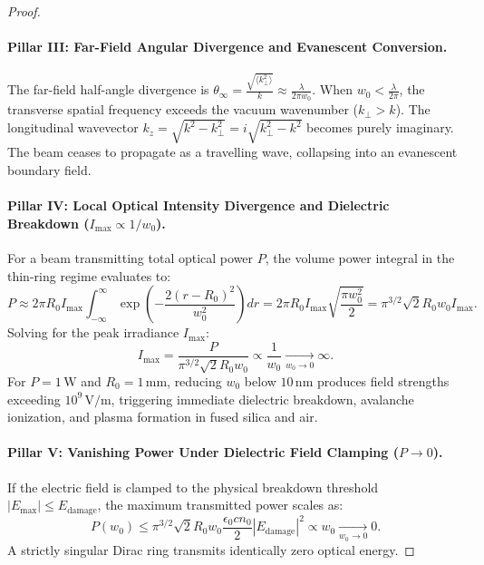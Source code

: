 \documentclass{optica-article}
\begin{document}
\begin{proof}
\paragraph{Pillar III: Far-Field Angular Divergence and Evanescent Conversion.}
The far-field half-angle divergence is $\theta_\infty = \frac{\sqrt{\langle k_\perp^2 \rangle}}{k} \approx \frac{\lambda}{2\pi w_0}$. When $w_0 < \frac{\lambda}{2\pi}$, the transverse spatial frequency exceeds the vacuum wavenumber ($k_\perp > k$). The longitudinal wavevector $k_z = \sqrt{k^2 - k_\perp^2} = i \sqrt{k_\perp^2 - k^2}$ becomes purely imaginary. The beam ceases to propagate as a travelling wave, collapsing into an evanescent boundary field.

\paragraph{Pillar IV: Local Optical Intensity Divergence and Dielectric Breakdown ($I_{\max} \propto 1/w_0$).}
For a beam transmitting total optical power $P$, the volume power integral in the thin-ring regime evaluates to:
\begin{equation}
P \approx 2\pi R_0 I_{\max} \int_{-\infty}^\infty \exp\left( - \frac{2(r - R_0)^2}{w_0^2} \right) dr = 2\pi R_0 I_{\max} \sqrt{\frac{\pi w_0^2}{2}} = \pi^{3/2} \sqrt{2} R_0 w_0 I_{\max}.
\label{eq:power_volume_integral}
\end{equation}
Solving for the peak irradiance $I_{\max}$:
\begin{equation}
\boxed{I_{\max} = \frac{P}{\pi^{3/2} \sqrt{2} R_0 w_0} \propto \frac{1}{w_0} \xrightarrow[w_0 \to 0]{} \infty.}
\label{eq:pillar4_result}
\end{equation}
For $P = 1\,\text{W}$ and $R_0 = 1\,\text{mm}$, reducing $w_0$ below $10\,\text{nm}$ produces field strengths exceeding $10^9\,\text{V/m}$, triggering immediate dielectric breakdown, avalanche ionization, and plasma formation in fused silica and air.

\paragraph{Pillar V: Vanishing Power Under Dielectric Field Clamping ($P \to 0$).}
If the electric field is clamped to the physical breakdown threshold $|E_{\max}| \le E_{\text{damage}}$, the maximum transmitted power scales as:
\begin{equation}
\boxed{P(w_0) \le \pi^{3/2} \sqrt{2} R_0 w_0 \frac{\epsilon_0 c n_0}{2} |E_{\text{damage}}|^2 \propto w_0 \xrightarrow[w_0 \to 0]{} 0.}
\label{eq:pillar5_result}
\end{equation}
A strictly singular Dirac ring transmits identically zero optical energy.


\end{proof}
\end{document}
